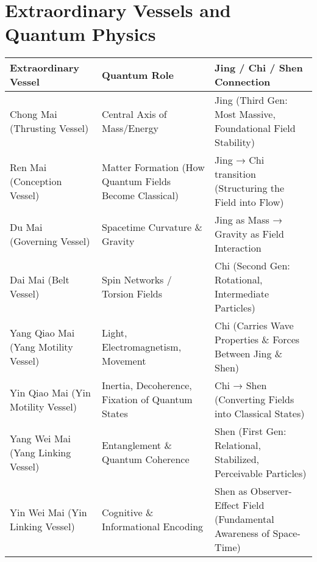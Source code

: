 \documentclass{article}
\begin{document}
\section*{Extraordinary Vessels and Quantum Physics}

\renewcommand{\arraystretch}{1.5} %

\begin{tabular}{|p{4cm}|p{5cm}|p{6.5cm}|}
\hline
\textbf{Extraordinary Vessel} & \textbf{Quantum Role} & \textbf{Jing / Chi / Shen Connection} \\
\hline
Chong Mai (Thrusting Vessel) & 
Central Axis of Mass/Energy & 
Jing (Third Gen: Most Massive, Foundational Field Stability) \\
\hline
Ren Mai (Conception Vessel) & 
Matter Formation (How Quantum Fields Become Classical) & 
Jing → Chi transition (Structuring the Field into Flow) \\
\hline
Du Mai (Governing Vessel) & 
Spacetime Curvature \& Gravity & 
Jing as Mass → Gravity as Field Interaction \\
\hline
Dai Mai (Belt Vessel) & 
Spin Networks / Torsion Fields & 
Chi (Second Gen: Rotational, Intermediate Particles) \\
\hline
Yang Qiao Mai (Yang Motility Vessel) & 
Light, Electromagnetism, Movement & 
Chi (Carries Wave Properties \& Forces Between Jing \& Shen) \\
\hline
Yin Qiao Mai (Yin Motility Vessel) & 
Inertia, Decoherence, Fixation of Quantum States & 
Chi → Shen (Converting Fields into Classical States) \\
\hline
Yang Wei Mai (Yang Linking Vessel) & 
Entanglement \& Quantum Coherence & 
Shen (First Gen: Relational, Stabilized, Perceivable Particles) \\
\hline
Yin Wei Mai (Yin Linking Vessel) & 
Cognitive \& Informational Encoding & 
Shen as Observer-Effect Field (Fundamental Awareness of Space-Time) \\
\hline
\end{tabular}
\end{document}
